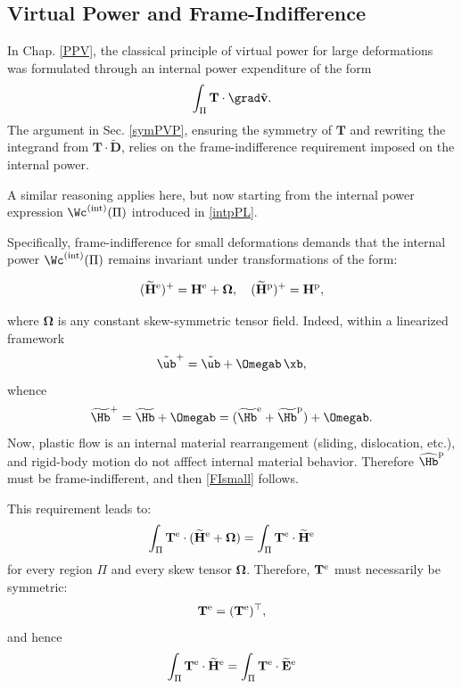 \subsection{Virtual Power and Frame-Indifference}

In Chap. \ref{PPV}, the classical principle of virtual power for large deformations was formulated through an internal power expenditure of the form
\begin{equation}
\int_{\Pi} \mathbf{T} \cdot \grad \tilde{\mathbf{v}}.
\end{equation}
The argument in Sec. \ref{symPVP}, ensuring the symmetry of \( \mathbf{T} \) and rewriting the integrand from \( \mathbf{T} \cdot\tilde{\mathbf{D}} \), relies on the frame-indifference requirement imposed on the internal power.

A similar reasoning applies here, but now starting from the internal power expression $\Wc^{\rm(int)}(\Pi)$ introduced in \eqref{intpPL}.

Specifically, frame-indifference for small deformations demands that the internal power $\Wc^{\rm(int)}(\Pi)$ remains invariant under transformations of the form:
\begin{definition}
	\begin{equation}\label{FIsmall}
	(\widetilde{\mathbf{H}}^{\rm e})^+ =\mathbf{H}^{\rm e} + \boldsymbol{\Omega}, \quad (\widetilde{\mathbf{H}}^{\rm p})^+= \mathbf{H}^{\rm p}, 
\end{equation}
\end{definition}
where \( \boldsymbol{\Omega} \) is any constant skew-symmetric tensor field. 
Indeed, within a linearized framework
\begin{equation}
\tilde\ub^+=\tilde\ub+\Omegab \,\xb,
\end{equation}
whence
\begin{equation}
\widetilde{\Hb}^+=\widetilde\Hb +\Omegab=(\widetilde{\Hb}^{\rm e}+\widetilde{\Hb}^{\rm p})+\Omegab.
\end{equation}
Now, plastic flow is an internal material rearrangement (sliding, dislocation, etc.), and rigid-body motion do not afffect internal material behavior. Therefore $\widehat{\Hb}^{\rm p}$ must be frame-indifferent, and then \eqref{FIsmall} follows.


This requirement leads to:
\[
\int_{\Pi} \mathbf{T}^{\rm e} \cdot (\widetilde{\mathbf{H}}^{\rm e} + \boldsymbol{\Omega})  = \int_{\Pi} \mathbf{T}^{\rm e} \cdot\widetilde{\mathbf{H}}^{\rm e} 
\]
for every region \( \Pi \) and every skew tensor \( \boldsymbol{\Omega} \). Therefore, \( \mathbf{T}^{\rm e} \) must necessarily be symmetric:
\begin{equation}\label{symTe}
\mathbf{T}^{\rm e} = (\mathbf{T}^{\rm e})^\top, 
\end{equation}
and hence
\[
\int_{\Pi} \mathbf{T}^{\rm e} \cdot\widetilde{\mathbf{H}}^{\rm e}  = \int_{\Pi} \mathbf{T}^{\rm e} \cdot \widetilde{\mathbf{E}}^{\rm e} 
\]

